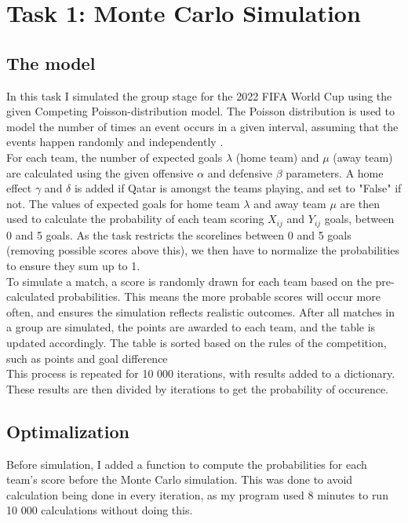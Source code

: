 \section{Task 1: Monte Carlo Simulation}

\subsection{The model}
In this task I simulated the group stage for the 2022 FIFA World Cup using the given Competing Poisson-distribution model. The Poisson distribution is used to model the number of times an event occurs in a given interval, assuming that the events happen randomly and independently \parencite[p. 202]{laguna2019}.\\

For each team, the number of expected goals $\lambda$ (home team) and $\mu$ (away team) are calculated using the given offensive $\alpha$ and defensive $\beta$ parameters. A home effect $\gamma$ and $\delta$ is added if Qatar is amongst the teams playing, and set to "False" if not. The values of expected goals for home team $\lambda$ and away team $\mu$ are then used to calculate the probability of each team scoring $X_{ij}$ and $Y_{ij}$ goals, between 0 and 5 goals. As the task restricts the scorelines between 0 and 5 goals (removing possible scores above this), we then have to normalize the probabilities to ensure they sum up to 1.\\

To simulate a match, a score is randomly drawn for each team based on the pre-calculated probabilities. This means the more probable scores will occur more often, and ensures the simulation reflects realistic outcomes. After all matches in a group are simulated, the points are awarded to each team, and the table is updated accordingly. The table is sorted based on the rules of the competition, such as points and goal difference \parencite{wiki_fifa2022} \\

This process is repeated for 10 000 iterations, with results added to a dictionary. These results are then divided by iterations to get the probability of occurence. \\

\subsection{Optimalization}

Before simulation, I added a function to compute the probabilities for each team's score before the Monte Carlo simulation. This was done to avoid calculation being done in every iteration, as my program used 8 minutes to run 10 000 calculations without doing this.

